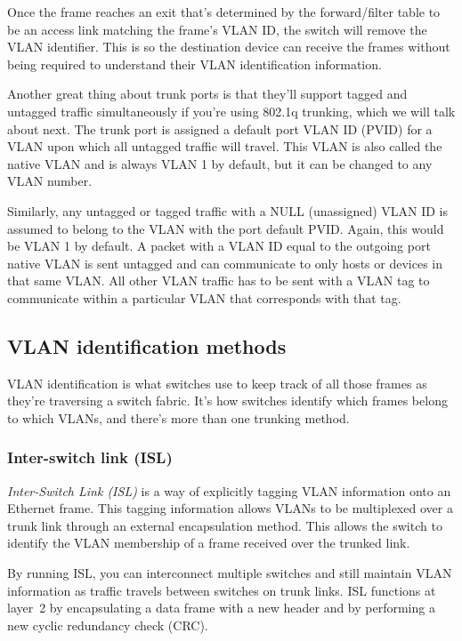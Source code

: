 Once the frame reaches an exit that's determined by the forward/filter
table to be an access link matching the frame's VLAN ID, the switch will
remove the VLAN identifier. This is so the destination device can
receive the frames without being required to understand their VLAN
identification information.

Another great thing about trunk ports is that they'll support tagged and
untagged traffic simultaneously if you're using 802.1q trunking, which
we will talk about next. The trunk port is assigned a default port VLAN
ID (PVID) for a VLAN upon which all untagged traffic will travel. This
VLAN is also called the native VLAN and is always VLAN 1 by default, but
it can be changed to any VLAN number.

Similarly, any untagged or tagged traffic with a NULL (unassigned) VLAN
ID is assumed to belong to the VLAN with the port default PVID. Again,
this would be VLAN 1 by default. A packet with a VLAN ID equal to the
outgoing port native VLAN is sent untagged and can communicate to only
hosts or devices in that same VLAN. All other VLAN traffic has to be
sent with a VLAN tag to communicate within a particular VLAN that
corresponds with that tag.



\subsection{VLAN identification methods}

VLAN identification is what switches use to keep track of all those
frames as they're traversing a switch fabric. It's how switches identify
which frames belong to which VLANs, and there's more than one trunking
method.

\subsubsection{Inter-switch link (ISL)}

\emph{Inter-Switch Link (ISL)} is a way of explicitly tagging VLAN
information onto an Ethernet frame. This tagging information allows
VLANs to be multiplexed over a trunk link through an external
encapsulation method. This allows the switch to identify the VLAN
membership of a frame received over the trunked link.

By running ISL, you can interconnect multiple switches and still
maintain VLAN information as traffic travels between switches on trunk
links. ISL functions at layer~2 by encapsulating a data frame with a new
header and by performing a new cyclic redundancy check (CRC).

